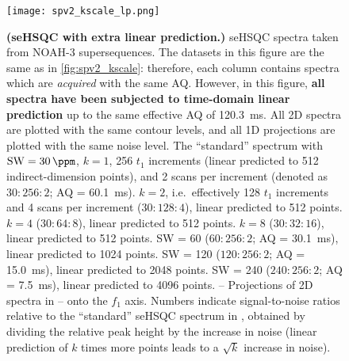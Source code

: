 \begin{figure}
    \centering
    \texttt{[image: spv2\_kscale\_lp.png]}
    {\label{fig:spv2_kscale_lp_std}}
    {\label{fig:spv2_kscale_lp_k2}}
    {\label{fig:spv2_kscale_lp_k4}}
    {\label{fig:spv2_kscale_lp_k8}}
    {\label{fig:spv2_kscale_lp_sw2}}
    {\label{fig:spv2_kscale_lp_sw4}}
    {\label{fig:spv2_kscale_lp_sw8}}
    {\label{fig:spv2_kscale_lp_std_proj}}
    {\label{fig:spv2_kscale_lp_k2_proj}}
    {\label{fig:spv2_kscale_lp_k4_proj}}
    {\label{fig:spv2_kscale_lp_k8_proj}}
    {\label{fig:spv2_kscale_lp_sw2_proj}}
    {\label{fig:spv2_kscale_lp_sw4_proj}}
    {\label{fig:spv2_kscale_lp_sw8_proj}}
    \caption{
        \textbf{(seHSQC with extra linear prediction.)}
        \nitrogen{} seHSQC spectra taken from NOAH-3  supersequences.
        The datasets in this figure are the same as in \cref{fig:spv2_kscale}: therefore, each column contains spectra which are \textit{acquired} with the same AQ.
        However, in this figure, \textbf{all spectra have been subjected to time-domain linear prediction} up to the same effective AQ of \SI{120.3}{\ms}.
        All 2D spectra are plotted with the same contour levels, and all 1D projections are plotted with the same noise level.
        \textbf{} The ``standard'' spectrum with $\mathrm{SW} = \SI{30}{\ppm}$, $k = 1$, 256 $t_1$ increments (linear predicted to 512 indirect-dimension points), and 2 scans per increment (denoted as $30:256:2$; AQ = \SI{60.1}{\ms}).
        \textbf{} $k = 2$, i.e.\ effectively 128 $t_1$ increments and 4 scans per increment ($30:128:4$), linear predicted to 512 points.
        \textbf{} $k = 4$ ($30:64:8$), linear predicted to 512 points.
        \textbf{} $k = 8$ ($30:32:16$), linear predicted to 512 points.
        \textbf{} SW = \SI{60}{\ppm} ($60:256:2$; AQ = \SI{30.1}{\ms}), linear predicted to 1024 points.
        \textbf{} SW = \SI{120}{\ppm} ($120:256:2$; AQ = \SI{15.0}{\ms}), linear predicted to 2048 points.
        \textbf{} SW = \SI{240}{\ppm} ($240:256:2$; AQ = \SI{7.5}{\ms}), linear predicted to 4096 points.
        \textbf{}--\textbf{} Projections of 2D spectra in -- onto the $f_1$ axis.
        Numbers indicate signal-to-noise ratios relative to the ``standard'' seHSQC spectrum in , obtained by dividing the relative peak height by the increase in noise (linear prediction of $k$ times more points leads to a $\sqrt{k}$ increase in noise).
        \grami{}
    }
    \label{fig:spv2_kscale_lp}
\end{figure}

